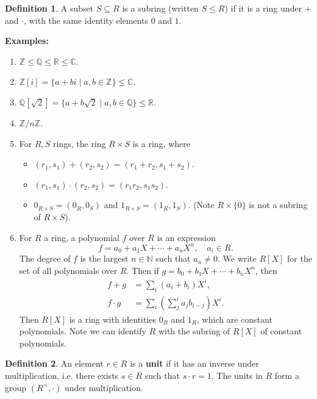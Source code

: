 \documentclass[12pt]{article}
\theoremstyle{definition}
\newtheorem{definition}{Definition}[section]
\theoremstyle{remark}
\begin{document}
\begin{definition}
	A subset $S \subseteq R$ is a subring (written $S \leq R$) if it is a ring under $+$ and $\cdot$, with the same identity elements $0$ and $1$.
\end{definition}

\textbf{Examples:} 

\begin{enumerate}[label = (\roman*)]
	\item $\mathbb{Z} \leq \mathbb{Q} \leq \mathbb{R} \leq \mathbb{C}$.
	\item $\mathbb{Z}[i] = \{a + bi \mid a, b \in \mathbb{Z}\} \leq \mathbb{C}$.
	\item $\mathbb{Q}[\sqrt{2}] = \{a + b\sqrt{2} \mid a, b \in \mathbb{Q}\} \leq \mathbb{R}$.
	\item $\mathbb{Z} / n \mathbb{Z}$.
	\item For $R, S$ rings, the ring $R \times S$ is a ring, where
		\begin{itemize}
			\item $(r_1, s_1) + (r_2, s_2) = (r_1 + r_2, s_1 + s_2)$.
			\item $(r_1, s_1) \cdot (r_2, s_2) = (r_1r_2, s_1s_2)$.
			\item $0_{R \times S} = (0_{R}, 0_{S})$ and $1_{R \times S} = (1_{R}, 1_{S})$. (Note $R \times \{0\}$ is not a subring of $R \times S$).
		\end{itemize}
	\item For $R$ a ring, a polynomial $f$ over $R$ is an expression
		\[
		f = a_0 + a_1X + \cdots + a_nX^{n}, \quad a_i \in R
		.\]
		The degree of $f$ is the largest $n \in \mathbb{N}$ such that $a_n \neq 0$. We write $R[X]$ for the set of all polynomials over $R$. Then if $g = b_0 + b_1X + \cdots + b_nX^{n}$, then
		\begin{align*}
			f + g &= \sum_{i}(a_i + b_i)X^{i}, \\
			f \cdot g &= \sum_{i} \left( \sum_{j}^{i} a_j b_{i - j} \right) X^{i}. 
		\end{align*}
		Then $R[X]$ is a ring with identities $0_{R}$ and $1_{R}$, which are constant polynomials. Note we can identify $R$ with the subring of $R[X]$ of constant polynomials.
\end{enumerate}

\begin{definition}
	An element $r \in R$ is a \textbf{unit} if it has an inverse under multiplication, i.e. there exists $s \in R$ such that $s \cdot r = 1$. The units in $R$ form a group $(R^{\times}, \cdot)$ under multiplication.
\end{definition}
\end{document}
